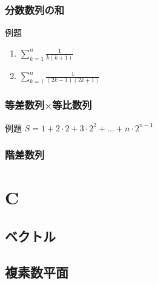 \documentclass[10pt,dvipdfmx]{jsarticle}
\begin{document}
\subsubsection*{分数数列の和}
\begin{itembox}[l]{例題}
  \begin{LARGE}
    \begin{enumerate}
      \item $\sum_{k=1}^{n}\frac{1}{k(k+1)}$
      \item $\sum_{k=1}^{n}\frac{1}{(2k-1)(2k+1)}$
    \end{enumerate}
  \end{LARGE}
\end{itembox}

\subsubsection*{等差数列$\times$等比数列}
\begin{itembox}[l]{例題}
  $S=1+2\cdot2+3\cdot2^2+\dots+n\cdot2^{n-1}$
  \vspace{20mm}
\end{itembox}

\subsubsection*{階差数列}


\section*{C}
\subsection*{ベクトル}
\subsection*{複素数平面}
\end{document}
